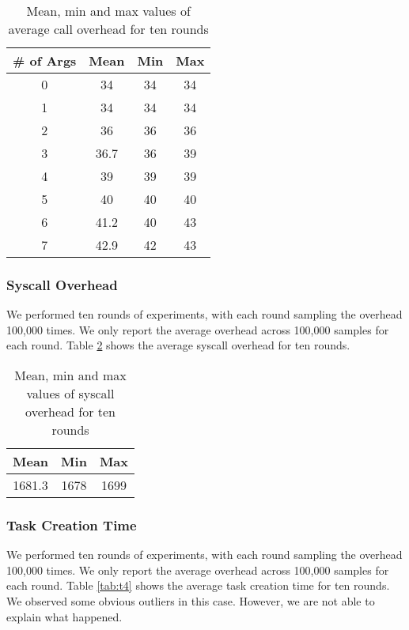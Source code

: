 \begin{table}[htb]

\caption{Mean, min and max values of average call overhead for ten rounds}

    \begin{tabular}{|c|c|c|c|} 
     \hline
     \# of Args & Mean & Min & Max \\ 
     \hline
     0 & 34 & 34 & 34 \\ 
     \hline
     1 & 34 & 34 & 34 \\ 
     \hline
     2 & 36 & 36 & 36 \\ 
     \hline
     3 & 36.7 & 36 & 39 \\ 
     \hline
     4 & 39 & 39 & 39 \\ 
     \hline
     5 & 40 & 40 & 40 \\ 
     \hline
     6 & 41.2 & 40 & 43 \\ 
     \hline
     7 & 42.9 & 42 & 43 \\ 
     \hline
    \end{tabular}
    \label{tab:t2}
\end{table}


\subsubsection{Syscall Overhead}
We performed ten rounds of experiments, with each round sampling the overhead 100,000 times. We only report the average overhead across 100,000 samples for each round.
Table \ref{tab:t3} shows the average syscall overhead for ten rounds. 

\begin{table}[tb]

    \caption{Mean, min and max values of syscall overhead for ten rounds}
    
    \begin{tabular}{|c|c|c|} 
        \hline
        Mean & Min & Max \\ 
        \hline
        1681.3 & 1678 & 1699 \\ 
        \hline
       \end{tabular}
        \label{tab:t3}
\end{table}

    
\subsubsection{Task Creation Time}
\label{subsubsec:tct}
We performed ten rounds of experiments, with each round sampling the overhead 100,000 times. We only report the average overhead across 100,000 samples for each round.
Table \ref{tab:t4} shows the average task creation time for ten rounds. We observed some obvious outliers in this case. However, we are not able to explain what happened.

